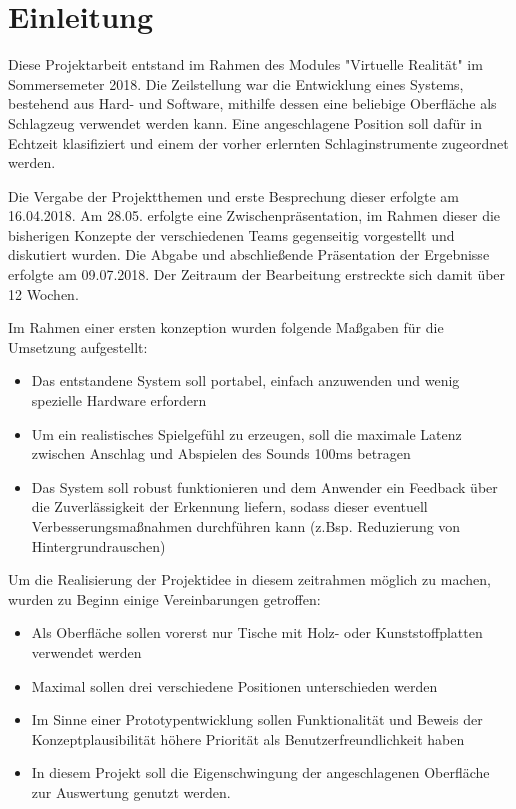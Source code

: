 \section*{Einleitung}
Diese Projektarbeit entstand im Rahmen des Modules "Virtuelle Realität" im Sommersemeter 2018. Die Zeilstellung war die Entwicklung eines Systems, bestehend aus Hard- und Software, mithilfe dessen eine beliebige Oberfläche als Schlagzeug verwendet werden kann.
Eine angeschlagene Position soll dafür in Echtzeit klasifiziert und einem der vorher erlernten Schlaginstrumente zugeordnet werden.

Die Vergabe der Projektthemen und erste Besprechung dieser erfolgte am 16.04.2018. Am 28.05. erfolgte eine Zwischenpräsentation, im Rahmen dieser die bisherigen Konzepte der verschiedenen Teams gegenseitig vorgestellt und diskutiert wurden. 
Die Abgabe und abschließende Präsentation der Ergebnisse erfolgte am 09.07.2018. 
Der Zeitraum der Bearbeitung erstreckte sich damit über 12 Wochen.

Im Rahmen einer ersten konzeption wurden folgende Maßgaben für die Umsetzung aufgestellt:
\begin{itemize}
	\item Das entstandene System soll portabel, einfach anzuwenden und wenig spezielle Hardware erfordern
	\item Um ein realistisches Spielgefühl zu erzeugen, soll die maximale Latenz zwischen Anschlag und Abspielen des Sounds 100ms betragen
	\item Das System soll robust funktionieren und dem Anwender ein Feedback über die Zuverlässigkeit der Erkennung liefern, sodass dieser eventuell Verbesserungsmaßnahmen durchführen kann (z.Bsp. Reduzierung von Hintergrundrauschen)
\end{itemize}

Um die Realisierung der Projektidee in diesem zeitrahmen möglich zu machen, wurden zu Beginn einige Vereinbarungen getroffen:
\begin{itemize}
	\item Als Oberfläche sollen vorerst nur Tische mit Holz- oder Kunststoffplatten verwendet werden
	\item Maximal sollen drei verschiedene Positionen unterschieden werden
	\item Im Sinne einer Prototypentwicklung sollen Funktionalität und Beweis der Konzeptplausibilität höhere Priorität als Benutzerfreundlichkeit haben
    \item In diesem Projekt soll die Eigenschwingung der angeschlagenen Oberfläche zur Auswertung genutzt werden. 
\end{itemize}


